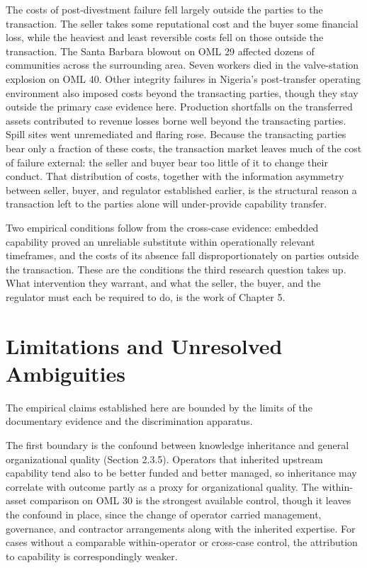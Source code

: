 The costs of post-divestment failure fell largely outside the parties to
the transaction. The seller takes some reputational cost and the buyer
some financial loss, while the heaviest and least reversible costs fell
on those outside the transaction. The Santa Barbara blowout on OML 29
affected dozens of communities across the surrounding area. Seven
workers died in the valve-station explosion on OML 40. Other integrity
failures in Nigeria's post-transfer operating environment also imposed
costs beyond the transacting parties, though they stay outside the
primary case evidence here. Production shortfalls on the transferred
assets contributed to revenue losses borne well beyond the transacting
parties. Spill sites went unremediated and flaring rose. Because the
transacting parties bear only a fraction of these costs, the transaction
market leaves much of the cost of failure external: the seller and buyer
bear too little of it to change their conduct. That distribution of
costs, together with the information asymmetry between seller, buyer,
and regulator established earlier, is the structural reason a
transaction left to the parties alone will under-provide capability
transfer.

Two empirical conditions follow from the cross-case evidence: embedded
capability proved an unreliable substitute within operationally relevant
timeframes, and the costs of its absence fall disproportionately on
parties outside the transaction. These are the conditions the third
research question takes up. What intervention they warrant, and what the
seller, the buyer, and the regulator must each be required to do, is the
work of Chapter 5.

\hypertarget{limitations-and-unresolved-ambiguities}{%
\section{Limitations and Unresolved
Ambiguities}\label{limitations-and-unresolved-ambiguities}}

The empirical claims established here are bounded by the limits of the
documentary evidence and the discrimination apparatus.

The first boundary is the confound between knowledge inheritance and
general organizational quality (Section 2.3.5). Operators that inherited
upstream capability tend also to be better funded and better managed, so
inheritance may correlate with outcome partly as a proxy for
organizational quality. The within-asset comparison on OML 30 is the
strongest available control, though it leaves the confound in place,
since the change of operator carried management, governance, and
contractor arrangements along with the inherited expertise. For cases
without a comparable within-operator or cross-case control, the
attribution to capability is correspondingly weaker.

